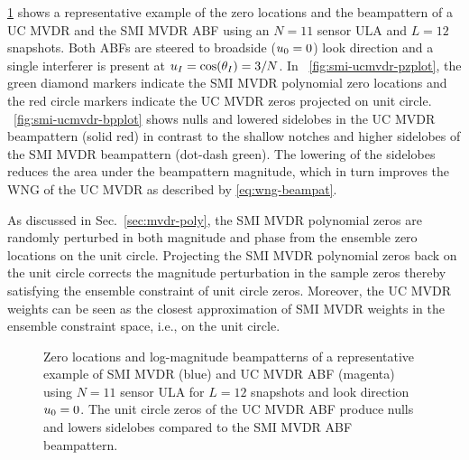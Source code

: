 

\figurename{} \ref{fig:smi-ucmvdr-plots} shows a representative
example of the zero locations and the beampattern of a UC MVDR and the
SMI MVDR ABF using an $N = 11$ sensor ULA and $L = 12$ snapshots. Both
ABFs are steered to broadside ($u_0 = 0$) look direction and a
single interferer is present at $u_I = \cos(\theta_I) = 3/N$. In
\figurename{}~\ref{fig:smi-ucmvdr-pzplot}, the green diamond markers
indicate the SMI MVDR polynomial zero locations and the red circle
markers indicate the UC MVDR zeros projected on unit
circle. \figurename{}~\ref{fig:smi-ucmvdr-bpplot} shows nulls and
lowered sidelobes in the UC MVDR beampattern (solid red) in contrast
to the shallow notches and higher sidelobes of the SMI MVDR
beampattern (dot-dash green). The lowering of the sidelobes reduces
the area under the beampattern magnitude, which in turn improves the
WNG of the UC MVDR as described by \eqref{eq:wng-beampat}.

As discussed in Sec.~\ref{sec:mvdr-poly}, the SMI MVDR polynomial
zeros are randomly perturbed in both magnitude and phase from the
ensemble zero locations on the unit circle. Projecting the SMI MVDR
polynomial zeros back on the unit circle corrects the magnitude
perturbation in the sample zeros thereby satisfying the
ensemble constraint of unit circle zeros. Moreover, the UC MVDR
weights can be seen as the closest approximation of SMI MVDR weights
in the ensemble constraint space, i.e., on the unit circle.

\begin{figure}[!hp]
\centering
{}

\caption{Zero locations and log-magnitude beampatterns of a
  representative example of SMI MVDR (blue) and UC MVDR ABF (magenta)
  using $N = 11$ sensor ULA for $L = 12$ snapshots and look direction
  $u_0 = 0$. The unit circle zeros of the UC MVDR ABF produce nulls
  and lowers sidelobes compared to the SMI MVDR ABF beampattern.}
\label{fig:smi-ucmvdr-plots}
\end{figure}

